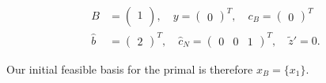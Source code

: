 \begin{solution}
    \begin{align*}
      B &= \begin{pmatrix}
        1  \\
      \end{pmatrix}, \quad y = \begin{pmatrix}
        0 
      \end{pmatrix}^T, \quad c_B = \begin{pmatrix}
        0
      \end{pmatrix}^T \\
      \hat{b} &= \begin{pmatrix}
        2
      \end{pmatrix}^T, \quad \hat{c}_N = \begin{pmatrix}
        0 & 0 & 1
      \end{pmatrix}^T, \quad \tilde{z}' = 0.
    \end{align*}

    Our initial feasible basis for the primal is therefore $x_B = \{ x_1 \}$.

\end{solution}